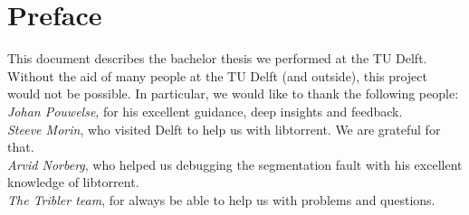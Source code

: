 \chapter*{Preface}
This document describes the bachelor thesis we performed at the TU Delft. Without the aid of many people at the TU Delft (and outside), this project would not be possible. In particular, we would like to thank the following people: \\

\emph{Johan Pouwelse}, for his excellent guidance, deep insights and feedback.\\

\emph{Steeve Morin}, who visited Delft to help us with libtorrent. We are grateful for that.\\

\emph{Arvid Norberg}, who helped us debugging the segmentation fault with his excellent knowledge of libtorrent.\\

\emph{The Tribler team}, for always be able to help us with problems and questions.